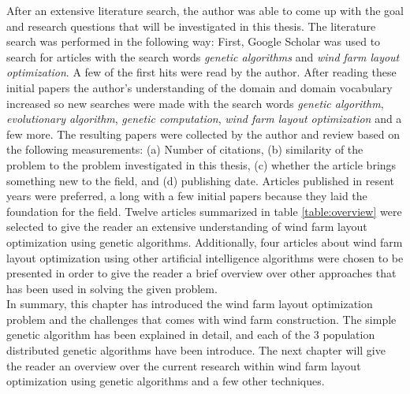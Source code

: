 \noindent After an extensive literature search, the author was able to come up with the goal and research questions that will be investigated in this thesis. The literature search was performed in the following way: First, Google Scholar was used to search for articles with the search words \textit{genetic algorithms} and \textit{wind farm layout optimization}. A few of the first hits were read by the author. After reading these initial papers the author's understanding of the domain and domain vocabulary increased so new searches were made with the search words  \textit{genetic algorithm}, \textit{evolutionary algorithm}, \textit{genetic computation}, \textit{wind farm layout optimization} and a few more. The resulting papers were collected by the author and review based on the following measurements: (a) Number of citations, (b) similarity of the problem to the problem investigated in this thesis, (c) whether the article brings something new to the field, and (d) publishing date. Articles published in resent years were preferred, a long with a few initial papers because they laid the foundation for the field. Twelve articles summarized in table \ref{table:overview} were selected to give the reader an extensive understanding of wind farm layout optimization using genetic algorithms. Additionally, four articles about wind farm layout optimization using other artificial intelligence algorithms were chosen to be presented in order to give the reader a brief overview over other approaches that has been used in solving the given problem. \\

\noindent In summary, this chapter has introduced the wind farm layout optimization problem and the challenges that comes with wind farm construction. The simple genetic algorithm has been explained in detail, and each of the 3 population distributed genetic algorithms have been introduce. The next chapter will give the reader an overview over the current research within wind farm layout optimization using genetic algorithms and a few other techniques.\\
